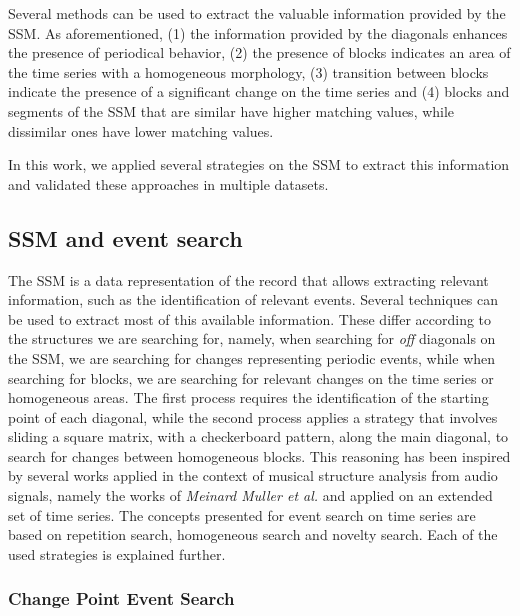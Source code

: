 Several methods can be used to extract the valuable information provided by the \gls{SSM}. As aforementioned, (1) the information provided by the diagonals enhances the presence of periodical behavior, (2) the presence of blocks indicates an area of the time series with a homogeneous morphology, (3) transition between blocks indicate the presence of a significant change on the time series and (4) blocks and segments of the \gls{SSM} that are similar have higher matching values, while dissimilar ones have lower matching values.
\par
In this work, we applied several strategies on the \gls{SSM} to extract this information and validated these approaches in multiple datasets.

\subsection{\gls{SSM} and event search}

The \gls{SSM} is a data representation of the record that allows extracting relevant information, such as the identification of relevant events. Several techniques can be used to extract most of this available information. These differ according to the structures we are searching for, namely, when searching for \textit{off} diagonals on the \gls{SSM}, we are searching for changes representing periodic events, while when searching for blocks, we are searching for relevant changes on the time series or homogeneous areas. The first process requires the identification of the starting point of each diagonal, while the second process applies a strategy that involves sliding a square matrix, with a checkerboard pattern, along the main diagonal, to search for changes between homogeneous blocks. This reasoning has been inspired by several works applied in the context of musical structure analysis from audio signals, namely the works of \textit{Meinard Muller et al.} \cite{Mueller15_FMP_SPRINGER, MuellerZ19_FMP_ISMIR} and applied on an extended set of time series. The concepts presented for event search on time series are based on repetition search, homogeneous search and novelty search. Each of the used strategies is explained further.

\subsubsection{Change Point Event Search}

